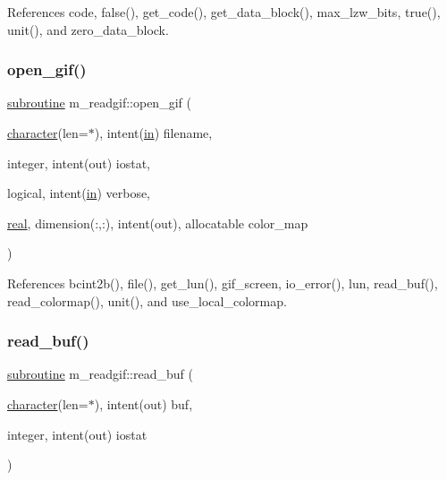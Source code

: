 References code, false(), get\+\_\+code(), get\+\_\+data\+\_\+block(), max\+\_\+lzw\+\_\+bits, true(), unit(), and zero\+\_\+data\+\_\+block.

\mbox{\label{namespacem__readgif_ae008e851af60f4d8fdeeb4fd96b8580d}} 
\subsubsection{\texorpdfstring{open\+\_\+gif()}{open\_gif()}}
{\footnotesize\ttfamily \hyperlink{M__stopwatch_83_8txt_acfbcff50169d691ff02d4a123ed70482}{subroutine} m\+\_\+readgif\+::open\+\_\+gif (\begin{DoxyParamCaption}\item[{\hyperlink{option__stopwatch_83_8txt_abd4b21fbbd175834027b5224bfe97e66}{character}(len=$\ast$), intent(\hyperlink{M__journal_83_8txt_afce72651d1eed785a2132bee863b2f38}{in})}]{filename,  }\item[{integer, intent(out)}]{iostat,  }\item[{logical, intent(\hyperlink{M__journal_83_8txt_afce72651d1eed785a2132bee863b2f38}{in})}]{verbose,  }\item[{\hyperlink{read__watch_83_8txt_abdb62bde002f38ef75f810d3a905a823}{real}, dimension(\+:,\+:), intent(out), allocatable}]{color\+\_\+map }\end{DoxyParamCaption})\hspace{0.3cm}{\ttfamily [private]}}



References bcint2b(), file(), get\+\_\+lun(), gif\+\_\+screen, io\+\_\+error(), lun, read\+\_\+buf(), read\+\_\+colormap(), unit(), and use\+\_\+local\+\_\+colormap.

\mbox{\label{namespacem__readgif_a272a4dbcc1419d3d103db4c50b757805}} 
\subsubsection{\texorpdfstring{read\+\_\+buf()}{read\_buf()}}
{\footnotesize\ttfamily \hyperlink{M__stopwatch_83_8txt_acfbcff50169d691ff02d4a123ed70482}{subroutine} m\+\_\+readgif\+::read\+\_\+buf (\begin{DoxyParamCaption}\item[{\hyperlink{option__stopwatch_83_8txt_abd4b21fbbd175834027b5224bfe97e66}{character}(len=$\ast$), intent(out)}]{buf,  }\item[{integer, intent(out)}]{iostat }\end{DoxyParamCaption})\hspace{0.3cm}{\ttfamily [private]}}



